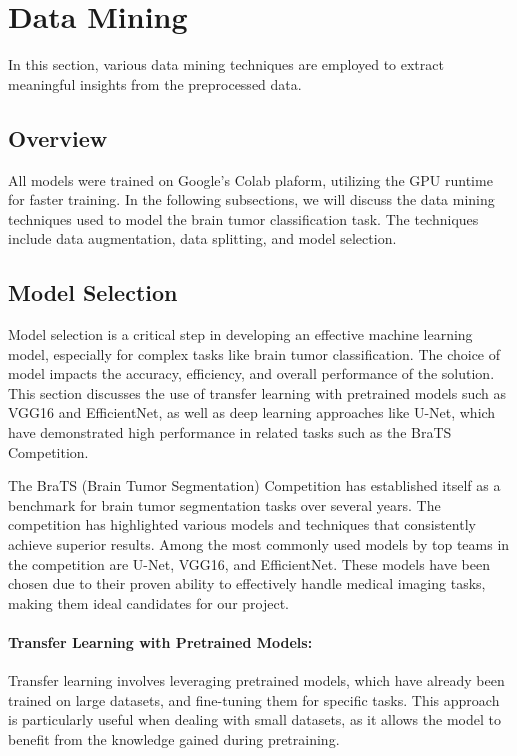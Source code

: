 \section{Data Mining}\label{data_mining}

In this section, various data mining techniques are employed to extract meaningful insights from the preprocessed data.

\subsection{Overview}\label{overview}

All models were trained on Google's Colab plaform, utilizing the GPU runtime for faster training. In the following subsections, we will discuss the data mining techniques used to model the brain tumor classification task. The techniques include data augmentation, data splitting, and model selection.

\subsection{Model Selection}\label{model_selection}

Model selection is a critical step in developing an effective machine learning model, especially for complex tasks like brain tumor classification. The choice of model impacts the accuracy, efficiency, and overall performance of the solution. This section discusses the use of transfer learning with pretrained models such as VGG16 and EfficientNet, as well as deep learning approaches like U-Net, which have demonstrated high performance in related tasks such as the BraTS Competition.

The BraTS (Brain Tumor Segmentation) Competition has established itself as a benchmark for brain tumor segmentation tasks over several years. The competition has highlighted various models and techniques that consistently achieve superior results. Among the most commonly used models by top teams in the competition are U-Net, VGG16, and EfficientNet. These models have been chosen due to their proven ability to effectively handle medical imaging tasks, making them ideal candidates for our project.

\paragraph{Transfer Learning with Pretrained Models:}
Transfer learning involves leveraging pretrained models, which have already been trained on large datasets, and fine-tuning them for specific tasks. This approach is particularly useful when dealing with small datasets, as it allows the model to benefit from the knowledge gained during pretraining. 

